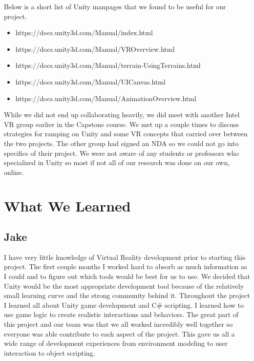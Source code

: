 \documentclass[10pt,journal,compsoc,onecolumn, draftclsnofoot]{IEEEtran}
\begin{document}
Below is a short list of Unity manpages that we found to be useful for our project.

\begin{itemize}
	\item https://docs.unity3d.com/Manual/index.html
	\item https://docs.unity3d.com/Manual/VROverview.html
	\item https://docs.unity3d.com/Manual/terrain-UsingTerrains.html
	\item https://docs.unity3d.com/Manual/UICanvas.html
	\item https://docs.unity3d.com/Manual/AnimationOverview.html \\
\end{itemize}

While we did not end up collaborating heavily, we did meet with another Intel VR group earlier in the Capstone course. We met up a couple times to discuss strategies for ramping on Unity and some VR concepts that carried over between the two projects. The other group had signed an NDA so we could not go into specifics of their project. We were not aware of any students or professors who specialized in Unity so most if not all of our research was done on our own, online.

\section{What We Learned}
\subsection{Jake}
I have very little knowledge of Virtual Reality development prior to starting this project. The first couple months I worked hard to absorb as much information as I could and to figure out which tools would be best for us to use. We decided that Unity would be the most appropriate development tool because of the relatively small learning curve and the strong community behind it. Throughout the project I learned all about Unity game development and C\# scripting. I learned how to use game logic to create realistic interactions and behaviors. The great part of this project and our team was that we all worked incredibly well together so everyone was able contribute to each aspect of the project. This gave us all a wide range of development experiences from environment modeling to user interaction to object scripting.
\end{document}
